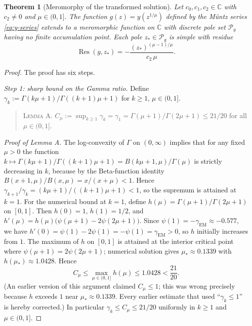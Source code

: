 \documentclass[11pt]{article}
\newtheorem{theorem}{Theorem}[section]
\theoremstyle{definition}
\theoremstyle{remark}
\DeclareMathOperator{\Res}{Res}
\begin{document}
\begin{theorem}[Meromorphy of the transformed solution]
\label{prop:meromorphy}
Let $c_{0},c_{1},c_{2}\in\mathbb{C}$ with $c_{2}\ne 0$ and $\mu\in(0,1]$. The function $g(z)=y(z^{1/\mu})$ defined by the M\"untz series \eqref{eq:y-series} extends to a meromorphic function on $\mathbb{C}$ with discrete pole set $\mathcal{P}_{g}$ having no finite accumulation point. Each pole $z_{*}\in\mathcal{P}_{g}$ is simple with residue
\begin{equation}
\Res(g,z_{*})=-\frac{(z_{*})^{(\mu-1)/\mu}}{c_{2}\,\mu}.
\label{eq:residue}
\end{equation}
\end{theorem}

\begin{proof}
The proof has six steps.

\emph{Step 1: sharp bound on the Gamma ratio.} Define $\gamma_{k}:=\Gamma(k\mu+1)/\Gamma((k+1)\mu+1)$ for $k\ge 1$, $\mu\in(0,1]$.

\begin{quote}
\textsc{Lemma A.} $C_{\mu}:=\sup_{k\ge 1}\gamma_{k}=\gamma_{1}=\Gamma(\mu+1)/\Gamma(2\mu+1)\le 21/20$ for all $\mu\in(0,1]$.
\end{quote}

\emph{Proof of Lemma A.} The log-convexity of $\Gamma$ on $(0,\infty)$ implies that for any fixed $\mu>0$ the function $k\mapsto\Gamma(k\mu+1)/\Gamma((k+1)\mu+1)=B(k\mu+1,\mu)/\Gamma(\mu)$ is strictly decreasing in $k$, because by the Beta-function identity $B(x+1,\mu)/B(x,\mu)=x/(x+\mu)<1$. Hence $\gamma_{k+1}/\gamma_{k}=(k\mu+1)/((k+1)\mu+1)<1$, so the supremum is attained at $k=1$. For the numerical bound at $k=1$, define $h(\mu)=\Gamma(\mu+1)/\Gamma(2\mu+1)$ on $[0,1]$. Then $h(0)=1$, $h(1)=1/2$, and $h'(\mu)=h(\mu)\bigl(\psi(\mu+1)-2\psi(2\mu+1)\bigr)$. Since $\psi(1)=-\gamma_{\mathrm{EM}}\approx-0.577$, we have $h'(0)=\psi(1)-2\psi(1)=-\psi(1)=\gamma_{\mathrm{EM}}>0$, so $h$ initially increases from $1$. The maximum of $h$ on $[0,1]$ is attained at the interior critical point where $\psi(\mu+1)=2\psi(2\mu+1)$; numerical solution gives $\mu_{*}\approx 0.1339$ with $h(\mu_{*})\approx 1.0428$. Hence
\begin{equation}
C_{\mu}\le\max_{\mu\in(0,1]}h(\mu)\le 1.0428<\frac{21}{20}.
\label{eq:Cmu-bound}
\end{equation}
(An earlier version of this argument claimed $C_{\mu}\le 1$; this was wrong precisely because $h$ exceeds $1$ near $\mu_{*}\approx 0.1339$. Every earlier estimate that used ``$\gamma_{k}\le 1$'' is hereby corrected.) In particular $\gamma_{k}\le C_{\mu}\le 21/20$ uniformly in $k\ge 1$ and $\mu\in(0,1]$.


\end{proof}
\end{document}
